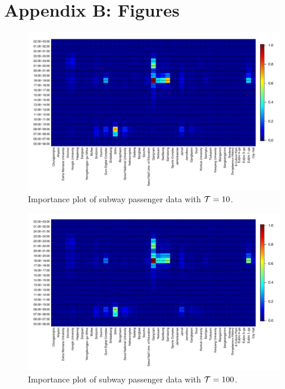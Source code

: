 \documentclass[preprint, review, 12pt]{article}
\theoremstyle{definition}
\theoremstyle{remark}
\begin{document}
\section*{Appendix B: Figures}
\begin{figure}
	\centering
	\includegraphics[width=1.05\textwidth]{Fig/In_scale_1.pdf}
	\vspace{-13mm}
	\caption{Importance plot of subway passenger data with ${\cal T}=10$.}
	\label{snow:subway_in_01}
\end{figure}

\begin{figure}
	\centering
	\includegraphics[width=1.05\textwidth]{Fig/In_scale_2.pdf}
	\vspace{-13mm}
	\caption{Importance plot of subway passenger data with ${\cal T}=100$.}
	\label{snow:subway_in_1}
\end{figure}
\end{document}
